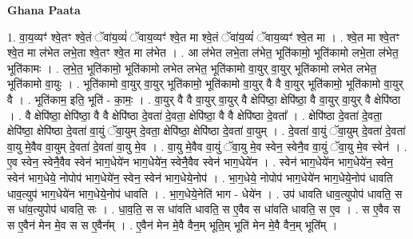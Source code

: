 \documentclass[17pt]{extarticle}
\begin{document}
\textbf{Ghana Paata } \newline

1. वा॒य॒व्यꣳ॑ श्वे॒तꣳ श्वे॒तं ॅवा॑य॒व्यं॑ ॅवाय॒व्यꣳ॑ श्वे॒त मा श्वे॒तं ॅवा॑य॒व्यं॑ ॅवाय॒व्यꣳ॑ श्वे॒त मा । . श्वे॒त मा श्वे॒तꣳ श्वे॒त मा ल॑भेत लभे॒ता श्वे॒तꣳ श्वे॒त 
मा ल॑भेत । . आ ल॑भेत लभे॒ता ल॑भेत॒ भूति॑कामो॒ भूति॑कामो लभे॒ता ल॑भेत॒ भूति॑कामः । . ल॒भे॒त॒ भूति॑कामो॒ भूति॑कामो लभेत लभेत॒ भूति॑कामो वा॒युर् वा॒युर् भूति॑कामो लभेत लभेत॒ भूति॑कामो वा॒युः । . भूति॑कामो वा॒युर् वा॒युर् भूति॑कामो॒ भूति॑कामो वा॒युर् वै वै वा॒युर् भूति॑कामो॒ भूति॑कामो वा॒युर् वै । . भूति॑काम॒ इति॒ भूति॑ - का॒मः॒ । . वा॒युर् वै वै वा॒युर् वा॒युर् वै क्षेपि॑ष्ठा॒ क्षेपि॑ष्ठा॒ वै वा॒युर् वा॒युर् वै क्षेपि॑ष्ठा । . वै क्षेपि॑ष्ठा॒ क्षेपि॑ष्ठा॒ वै वै क्षेपि॑ष्ठा दे॒वता॑ दे॒वता॒ क्षेपि॑ष्ठा॒ वै वै क्षेपि॑ष्ठा दे॒वता᳚ । . क्षेपि॑ष्ठा दे॒वता॑ दे॒वता॒ क्षेपि॑ष्ठा॒ क्षेपि॑ष्ठा दे॒वता॑ वा॒युं ॅवा॒युम् दे॒वता॒ क्षेपि॑ष्ठा॒ क्षेपि॑ष्ठा दे॒वता॑ वा॒युम् । . दे॒वता॑ वा॒युं ॅवा॒युम् दे॒वता॑ दे॒वता॑ वा॒यु मे॒वैव वा॒युम् दे॒वता॑ दे॒वता॑ वा॒यु मे॒व । . वा॒यु मे॒वैव वा॒युं ॅवा॒यु मे॒व स्वेन॒ स्वेनै॒व वा॒युं ॅवा॒यु मे॒व स्वेन॑ । . ए॒व स्वेन॒ स्वेनै॒वैव स्वेन॑ भाग॒धेये॑न भाग॒धेये॑न॒ स्वेनै॒वैव स्वेन॑ भाग॒धेये॑न । . स्वेन॑ भाग॒धेये॑न भाग॒धेये॑न॒ स्वेन॒ स्वेन॑ भाग॒धेये॒ नोपोप॑ भाग॒धेये॑न॒ स्वेन॒ स्वेन॑ भाग॒धेये॒नोप॑ । . भा॒ग॒धेये॒ नोपोप॑ भाग॒धेये॑न भाग॒धेये॒नोप॑ धावति धाव॒त्युप॑ भाग॒धेये॑न भाग॒धेये॒नोप॑ धावति । . भा॒ग॒धेये॒नेति॑ भाग - धेये॑न । . उप॑ धावति धाव॒त्युपोप॑ धावति॒ स स धा॑व॒त्युपोप॑ धावति॒ सः । . धा॒व॒ति॒ स स धा॑वति धावति॒ स ए॒वैव स धा॑वति धावति॒ स ए॒व । . स ए॒वैव स स ए॒वैन॑ मेन मे॒व स स ए॒वैन᳚म् । . ए॒वैन॑ मेन मे॒वै वैन॒म् भूति॒म् भूति॑ मेन मे॒वै वैन॒म् भूति᳚म् । \newline
\end{document}
